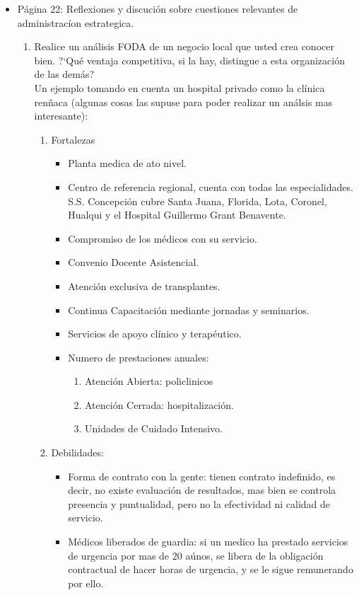 \begin{itemize}
	\item P\'agina 22: Reflexiones y discuci\'on sobre cuestiones relevantes de administrac\'ion estrategica.
	\begin{enumerate}
		\item Realice un an\'alisis FODA de un negocio local que usted crea conocer bien. ?`Qu\'e ventaja competitiva, si la hay, distingue a esta organizaci\'on de las dem\'as?\\
	Un ejemplo tomando en cuenta un hospital privado como la cl\'inica ren\~naca (algunas cosas las supuse para poder realizar un an\'alsis mas interesante):\\
\begin{enumerate}
		\item Fortalezas
\begin{itemize}
	\item Planta medica de ato nivel.
	\item Centro de referencia regional, cuenta con todas las especialidades. S.S. Concepci\'on cubre Santa Juana, Florida, Lota, Coronel, Hualqui y el Hospital Guillermo Grant Benavente.
	\item Compromiso de los m\'edicos con su servicio.
	\item Convenio Docente Asistencial.
	\item Atenci\'on exclusiva de transplantes.
	\item Continua Capacitaci\'on mediante jornadas y seminarios.
	\item Servicios de apoyo cl\'inico y terap\'eutico.
	\item Numero de prestaciones anuales:
	\begin{enumerate}
		\item Atenci\'on Abierta: policlinicos
		\item Atenci\'on Cerrada: hospitalizaci\'on.
		\item Unidades de Cuidado Intensivo.
	\end{enumerate}
\end{itemize}
		\item Debilidades:
\begin{itemize}
	\item Forma de contrato con la gente: tienen contrato indefinido, es decir, no existe evaluaci\'on de resultados, mas bien se controla presencia y puntualidad, pero no la efectividad ni calidad de servicio.
	\item M\'edicos liberados de guardia: si un medico ha prestado servicios de urgencia por mas de 20 a\'unos, se libera de la obligaci\'on contractual de hacer horas de urgencia, y se le sigue remunerando por ello.

\end{itemize}
\end{enumerate}
\end{enumerate}
\end{itemize}
